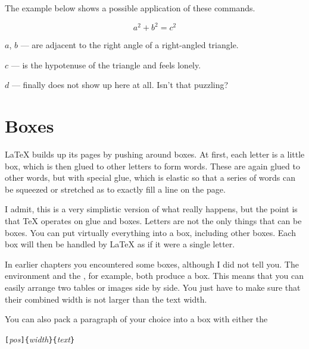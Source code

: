 \noindent The example below shows a possible application of these commands.

\begin{example}[examplewidth=0.45\linewidth]
\newenvironment{vardesc}[1]{%
  \settowidth{\parindent}{#1:\ }
  \makebox[0pt][r]{#1:\ }}{}

\begin{displaymath}
a^2+b^2=c^2
\end{displaymath}

\begin{vardesc}{Where}\(a\),
\(b\) --- are adjacent to the right
angle of a right-angled triangle.

\(c\) --- is the hypotenuse of
the triangle and feels lonely.

\(d\) --- finally does not show up
here at all. Isn't that puzzling?
\end{vardesc}
\end{example}

\section{Boxes}\label{sec:boxes}
\LaTeX{} builds up its pages by pushing around boxes. At first, each
letter is a little box, which is then glued to other letters to form
words. These are again glued to other words, but with special glue,
which is elastic so that a series of words can be squeezed or
stretched as to exactly fill a line on the page.

I admit, this is a very simplistic version of what really happens, but the
point is that \TeX{} operates on glue and boxes. Letters are not the only
things that can be boxes. You can put virtually everything into a box,
including other boxes. Each box will then be handled by \LaTeX{} as if it
were a single letter.

In earlier chapters you encountered some boxes, although I did
not tell you. The  environment and the , for
example, both produce a box. This means that you can easily arrange two
tables or images side by side. You just have to make sure that their
combined width is not larger than the text width.

You can also pack a paragraph of your choice into a box with either
the

\begin{lscommand}
  \verb|[|\emph{pos}\verb|]{|\emph{width}\verb|}{|\emph{text}\verb|}|
\end{lscommand}

